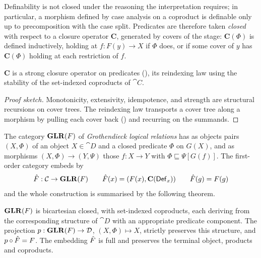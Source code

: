 Definability is not closed under the reasoning the interpretation requires; in particular, a morphism
defined by case analysis on a coproduct is definable only up to precomposition with the case split.
Predicates are therefore taken \emph{closed} with respect to a closure operator $\mathbf{C}$,
generated by covers of the stage: $\mathbf{C}(\Phi)$ is defined
inductively, holding at $f : F(y) \to X$ if $\Phi$ does, or if some cover of $y$ has
$\mathbf{C}(\Phi)$ holding at each restriction of $f$.

\begin{lemma}
\label{lem:conservativity:indexed-closure}
$\mathbf{C}$ is a strong closure operator on predicates (), its
reindexing law using the stability of the set-indexed coproducts of $\cat{C}$.
\end{lemma}

\begin{proof}[Proof sketch]
Monotonicity, extensivity, idempotence, and strength are structural recursions on cover trees.
The reindexing law transports a cover tree along a morphism by pulling each cover back
() and recurring on the summands.
\end{proof}

The category $\mathbf{GLR}(F)$ of \emph{Grothendieck logical relations} has as objects pairs $(X, \Phi)$ of an
object $X \in \cat{D}$ and a closed predicate $\Phi$ on $G(X)$, and as morphisms $(X, \Phi) \to (Y,
\Psi)$ those $f : X \to Y$ with $\Phi \sqsubseteq \Psi[G(f)]$. The first-order category
embeds by
\[
  \hat{F} : \mathcal{C} \to \mathbf{GLR}(F) \qquad \hat{F}(x) = (F(x), \mathbf{C}(\mathsf{Def}_x)) \qquad \hat{F}(g) = F(g)
\]
and the whole construction is summarised by the following theorem.

\begin{theorem}
\label{thm:conservativity:glr}
$\mathbf{GLR}(F)$ is bicartesian closed, with set-indexed coproducts, each deriving from the
corresponding structure of $\cat{D}$ with an appropriate predicate component. The projection $p :
\mathbf{GLR}(F) \to \mathcal{D}$, $(X, \Phi) \mapsto X$, strictly preserves this structure, and $p \circ \hat{F} =
F$. The embedding $\hat{F}$ is full and preserves the terminal object, products and coproducts.
\end{theorem}

